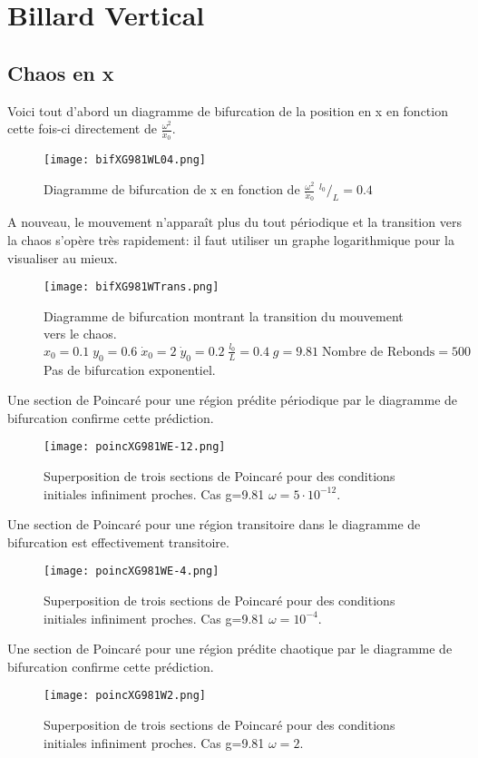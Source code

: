 \documentclass[a4paper]{report}
\begin{document}
\section{Billard Vertical}
\subsection{Chaos en x}
Voici tout d'abord un diagramme de bifurcation de la position en x en fonction cette fois-ci directement de \( \frac{ \omega ^2 }{\dot{x}_0}\).
\begin{figure}[H]
   \texttt{[image: bifXG981WL04.png]}
      \caption[Diagramme de bifurcation de x en fonction de \( \frac{\omega ^2}{\dot{x}_0}\): g=9.81, \(^{l_0}/_L=0.4\)]{Diagramme de bifurcation de x en fonction de \( \frac{\omega ^2}{\dot{x}_0}\) \(^{l_0}/_L=0.4\)}
\end{figure}
A nouveau, le mouvement n'apparaît plus du tout périodique et la transition vers la chaos s'opère très rapidement: il faut utiliser un graphe logarithmique pour la visualiser au mieux.
\begin{figure}[H]
   \texttt{[image: bifXG981WTrans.png]}
      \caption[Transition du mouvement vers le chaos en fonction de \( \frac{\omega ^2 }{\dot{x}_0}\): g=9.81]{Diagramme de bifurcation montrant la transition du mouvement vers le chaos.\\ \(x_0=0.1 \; y_0=0.6 \; \dot{x}_0=2 \; \dot{y}_0=0.2 \; \frac{l_0}{L}=0.4 \; g=9.81 \; \text{Nombre de Rebonds}=500\) Pas de bifurcation exponentiel.}
\end{figure}

Une section de Poincaré pour une région prédite périodique par le diagramme de bifurcation confirme cette prédiction.
\begin{figure}[H]
   \texttt{[image: poincXG981WE-12.png]}
      \caption[Section de Poincaré périodique: g=981 \(\omega=5 \cdot 10^{-12}\)]{Superposition de trois sections de Poincaré pour des conditions initiales infiniment proches. Cas g=9.81 \(\omega=5 \cdot 10^{-12}\).}
\end{figure}
Une section de Poincaré pour une région transitoire dans le diagramme de bifurcation est effectivement transitoire.
\begin{figure}[H]
   \texttt{[image: poincXG981WE-4.png]}
      \caption[Section de Poincaré transitoire: g=9.81 \(\omega=10^{-4}\)]{Superposition de trois sections de Poincaré pour des conditions initiales infiniment proches. Cas g=9.81 \(\omega=10^{-4}\).}
\end{figure}
Une section de Poincaré pour une région prédite chaotique par le diagramme de bifurcation confirme cette prédiction.
\begin{figure}[H]
   \texttt{[image: poincXG981W2.png]}
      \caption[Section de Poincaré chaotique: g=9.81 \(\omega=2\)]{Superposition de trois sections de Poincaré pour des conditions initiales infiniment proches. Cas g=9.81 \(\omega=2\).}
\end{figure}
\end{document}
